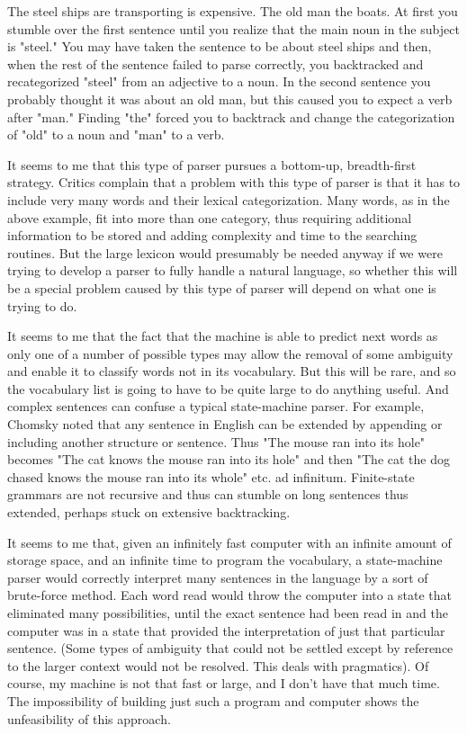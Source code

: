 The steel ships are transporting is expensive.
The old man the boats.
At first you stumble over the first sentence until you realize that the main noun in the subject is "steel." You may have taken the sentence to be about steel ships and then, when the rest of the sentence failed to parse correctly, you backtracked and recategorized "steel" from an adjective to a noun. In the second sentence you probably thought it was about an old man, but this caused you to expect a verb after "man." Finding "the" forced you to backtrack and change the categorization of "old" to a noun and "man" to a verb.

It seems to me that this type of parser pursues a bottom-up, breadth-first strategy. Critics complain that a problem with this type of parser is that it has to include very many words and their lexical categorization. Many words, as in the above example, fit into more than one category, thus requiring additional information to be stored and adding complexity and time to the searching routines. But the large lexicon would presumably be needed anyway if we were trying to develop a parser to fully handle a natural language, so whether this will be a special problem caused by this type of parser will depend on what one is trying to do.

It seems to me that the fact that the machine is able to predict next words as only one of a number of possible types may allow the removal of some ambiguity and enable it to classify words not in its vocabulary. But this will be rare, and so the vocabulary list is going to have to be quite large to do anything useful. And complex sentences can confuse a typical state-machine parser. For example, Chomsky noted that any sentence in English can be extended by appending or including another structure or sentence. Thus "The mouse ran into its hole" becomes "The cat knows the mouse ran into its hole" and then "The cat the dog chased knows the mouse ran into its whole" etc. ad infinitum. Finite-state grammars are not recursive and thus can stumble on long sentences thus extended, perhaps stuck on extensive backtracking.

It seems to me that, given an infinitely fast computer with an infinite amount of storage space, and an infinite time to program the vocabulary, a state-machine parser would correctly interpret many sentences in the language by a sort of brute-force method. Each word read would throw the computer into a state that eliminated many possibilities, until the exact sentence had been read in and the computer was in a state that provided the interpretation of just that particular sentence. (Some types of ambiguity that could not be settled except by reference to the larger context would not be resolved. This deals with pragmatics). Of course, my machine is not that fast or large, and I don't have that much time. The impossibility of building just such a program and computer shows the unfeasibility of this approach.

